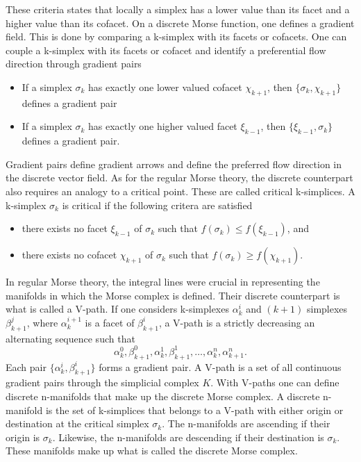 These criteria states that locally a simplex has a lower value than its facet and
a higher value than its cofacet. On a discrete Morse function, one defines a
gradient field. This is done by comparing a k-simplex with its facets or
cofacets. One can couple a k-simplex with its facets or cofacet and identify a
preferential flow direction through gradient pairs
\begin{itemize}
    \item If a simplex $\sigma_k$ has exactly one lower valued cofacet $\chi_{k+1}$, then
          $\{\sigma_k,\chi_{k+1}\}$ defines a gradient pair
    \item If a simplex $\sigma_k$ has exactly one higher valued facet $\xi_{k-1}$, then
          $\{\xi_{k-1},\sigma_{k}\}$ defines a gradient pair.
\end{itemize}
Gradient pairs define gradient arrows and define the preferred flow direction in
the discrete vector field. As for the regular Morse theory, the discrete
counterpart also requires an analogy to a critical point. These are called
critical k-simplices. A k-simplex $\sigma_k$ is critical if the following
critera are satisfied
\begin{itemize}
    \item there exists no facet $\xi_{k-1}$ of $\sigma_{k}$ such
    that $f(\sigma_k)\leq f(\xi_{k-1})$, and
    \item there exists no cofacet $\chi_{k+1}$ of $\sigma_{k}$ such
    that $f(\sigma_k)\geq f(\chi_{k+1})$.
\end{itemize}
In regular Morse theory, the integral lines were crucial in representing the
manifolds in which the Morse complex is defined. Their discrete counterpart
is what is called a V-path. If one considers k-simplexes $\alpha^i_k$ and
$(k+1)$ simplexes $\beta^j_{k+1}$, where $\alpha^{i+1}_k$ is a facet of $\beta^i_{k+1}$, a
V-path is a strictly decreasing an alternating sequence such that
\begin{equation}
    \alpha^0_k, \beta^0_{k+1},\alpha^1_k,\beta^1_{k+1},\dots,\alpha^n_k,\alpha^n_{k+1}.
\end{equation}
Each pair $\{\alpha^i_k,\beta^i_{k+1}\}$ forms a gradient pair. A V-path is a set
of all continuous gradient pairs through the simplicial complex $K$.
With V-paths one can define discrete n-manifolds that make up the discrete
Morse complex. A discrete n-manifold is the set of k-simplices that belongs to a
V-path with either origin or destination at the critical simplex $\sigma_k$.
The n-manifolds are ascending if their origin is $\sigma_k$. Likewise,
the n-manifolds are descending if their destination is $\sigma_k$. These
manifolds make up what is called the discrete Morse complex.


